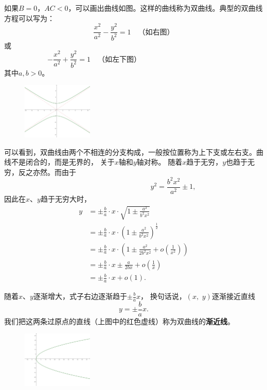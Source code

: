 \documentclass[12pt,UTF8]{ctexbook}
\newcommand{\olim}[1]{\mathit{o}\left(#1\right)}  %
\theoremstyle{definition}
\theoremstyle{plain}
\begin{document}
如果$B = 0$，$AC < 0$，可以画出曲线如图。这样的曲线称为双曲线。典型的双曲线方程可以写为：
$$ \frac{x^2}{a^2} - \frac{y^2}{b^2} = 1 \quad \mbox{（如右图）}$$
或
$$ - \frac{x^2}{a^2} + \frac{y^2}{b^2} = 1  \quad \mbox{（如左下图）} \qquad  \qquad  \qquad  \qquad \;\: \quad \phantom{123}$$
其中$a,b>0$。

\begin{figure} 
    \vspace{-28pt}
    \flushright
    \includegraphics[width=0.3\textwidth]{tu/双曲线2.png}
\end{figure}

可以看到，双曲线由两个不相连的分支构成，一般按位置称为上下支或左右支。曲线不是闭合的，而是无界的，
关于$x$轴和$y$轴对称。
随着$x$趋于无穷，$y$也趋于无穷，反之亦然。而由于
$$ \phantom{123455}\qquad \qquad \qquad \qquad y^2 = \frac{b^2x^2}{a^2} \pm 1, $$
因此在$x$、$y$趋于无穷大时，
\begin{align*}
    y &= \pm \frac{b}{a} \cdot x \cdot \sqrt{1 \pm \frac{a^2}{b^2x^2}} \\ 
    &= \pm \frac{b}{a} \cdot x \cdot \left(1 \pm \frac{a^2}{b^2x^2}\right)^{\frac{1}{2}} \\
    &= \pm \frac{b}{a} \cdot x \cdot \left(1 \pm \frac{a^2}{2b^2x^2} + \olim{\frac{1}{x^2}} \right)\\
    &= \pm \frac{b}{a} \cdot x \pm \frac{a}{2bx} + \olim{\frac{1}{x}} \\
    &= \pm \frac{b}{a} \cdot x + \olim{1}.
\end{align*}

随着$x$、$y$逐渐增大，式子右边逐渐趋于$\displaystyle\pm \frac{b}{a} x$，
换句话说，$(x, \,\, y)$逐渐接近直线
$$ y = \pm \frac{b}{a}x. $$
我们把这两条过原点的直线（上图中的红色虚线）称为双曲线的\textbf{渐近线}。

\begin{figure} %
    \flushright
    \includegraphics[width=0.3\textwidth]{tu/抛物线1.png}
\end{figure}
\end{document}
